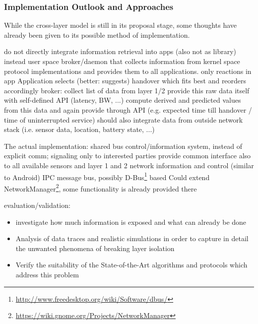 \subsubsection{Implementation Outlook and Approaches}

While the cross-layer model is still in its proposal stage, some thoughts have already been given to its possible method of implementation.


do not directly integrate information retrieval into apps (also not as library)
instead user space broker/daemon  that collects information from kernel space protocol implementations and provides them to all applications.
only reactions in app 
Application selects (better: suggests) handover which fits best and reorders accordingly
broker: collect list of data from layer 1/2 
	provide this raw data itself with self-defined API (latency, BW, ...)
	compute derived and predicted values from this data and again provide through API (e.g. expected time till handover / time of uninterrupted service)
	should also integrate data from outside network stack (i.e. sensor data, location, battery state, ...)



The actual implementation:
shared bus control/information system, instead of explicit comm; signaling only to interested parties
provide common interface also to all available sensors and layer 1 and 2 network information and control (similar to Android)
IPC message bus, possibly D-Bus\footnote{\url{http://www.freedesktop.org/wiki/Software/dbus/}} based
Could extend NetworkManager\footnote{\url{https://wiki.gnome.org/Projects/NetworkManager}}, some functionality is already provided there



evaluation/validation:
\begin{itemize}
	\item investigate how much information is exposed and what can already be done
	\item Analysis of data traces and realistic simulations in order to capture in detail the unwanted phenomena of breaking layer isolation
	\item Verify the suitability of the State-of-the-Art algorithms and protocols which address this problem
\end{itemize}









